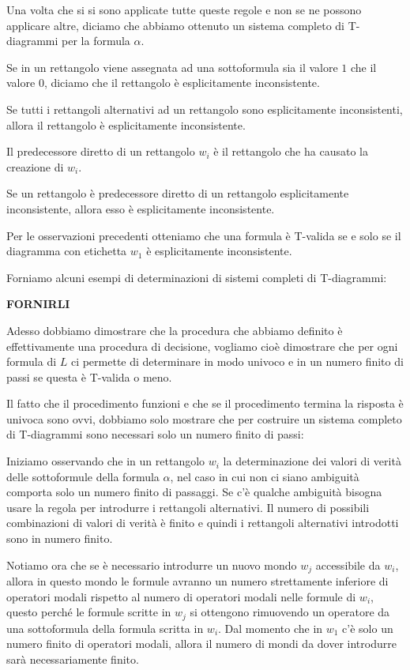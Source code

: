 \documentclass[a4paper, titlepage, 12pt]{report}
\begin{document}
Una volta che si si sono applicate tutte queste regole e non se ne possono applicare altre,
diciamo che abbiamo ottenuto un sistema completo di T-diagrammi per la formula $\alpha$.

Se in un rettangolo viene assegnata ad una sottoformula sia il valore $1$ che il valore $0$,
diciamo che il rettangolo è esplicitamente inconsistente.

Se tutti i rettangoli alternativi ad un rettangolo sono esplicitamente inconsistenti,
allora il rettangolo è esplicitamente inconsistente.

Il predecessore diretto di un rettangolo $w_i$ è il rettangolo che ha causato
la creazione di $w_i$.

Se un rettangolo è predecessore diretto di un rettangolo esplicitamente inconsistente,
allora esso è esplicitamente inconsistente.

Per le osservazioni precedenti otteniamo che una formula è T-valida
se e solo se il diagramma con etichetta $w_1$ è esplicitamente inconsistente.

Forniamo alcuni esempi di determinazioni di sistemi completi di T-diagrammi:

\textbf{FORNIRLI}


Adesso dobbiamo dimostrare che la procedura che abbiamo definito è effettivamente
una procedura di decisione, vogliamo cioè dimostrare che per ogni formula di $L$
ci permette di determinare in modo univoco e in un numero finito di passi
se questa è T-valida o meno.

Il fatto che il procedimento funzioni e che se il procedimento termina la risposta è univoca
sono ovvi, dobbiamo solo mostrare che per costruire un sistema completo di T-diagrammi
sono necessari solo un numero finito di passi:

Iniziamo osservando che in un rettangolo $w_i$
la determinazione dei valori di verità delle sottoformule della formula $\alpha$,
nel caso in cui non ci siano ambiguità comporta solo un numero finito di passaggi.
Se c'è qualche ambiguità bisogna usare la regola per introdurre i rettangoli alternativi.
Il numero di possibili combinazioni di valori di verità è finito e quindi
i rettangoli alternativi introdotti sono in numero finito.

Notiamo ora che se è necessario introdurre un nuovo mondo $w_j$ accessibile da $w_i$,
allora in questo mondo le formule avranno un numero strettamente inferiore di operatori
modali rispetto al numero di operatori modali nelle formule di $w_i$, questo perché
le formule scritte in $w_j$ si ottengono rimuovendo un operatore da una sottoformula
della formula scritta in $w_i$.
Dal momento che in $w_1$ c'è solo un numero finito di operatori
modali, allora il numero di mondi da dover introdurre sarà necessariamente finito.
\end{document}
